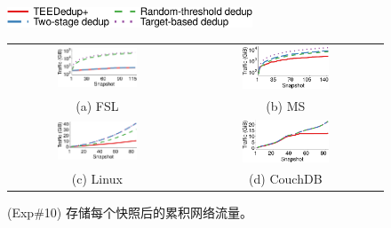 \begin{figure}[!htb]
    \centering
    \includegraphics[width=0.65\textwidth]{pic/featurespy/plot/bandwidth/upload_traffic_legend.pdf}     \vspace{3pt} \\
    \begin{tabular}{@{\ }c@{\ }c}
        \includegraphics[width=0.47\textwidth]{pic/featurespy/plot/bandwidth/upload_traffic_fsl.pdf}   &
        \includegraphics[width=0.47\textwidth]{pic/featurespy/plot/bandwidth/upload_traffic_ms.pdf}                           \\
        {\small (a) FSL}                                                                               & {\small (b) MS}      \\
        \includegraphics[width=0.47\textwidth]{pic/featurespy/plot/bandwidth/upload_traffic_linux.pdf} &
        \includegraphics[width=0.47\textwidth]{pic/featurespy/plot/bandwidth/upload_traffic_couch.pdf}                        \\
        {\small (c) Linux}                                                                             & {\small (d) CouchDB}
    \end{tabular}
    \caption{(Exp\#10) 存储每个快照后的累积网络流量。}
    \label{fig:featurespy-expNetworkTraffic}
\end{figure}

